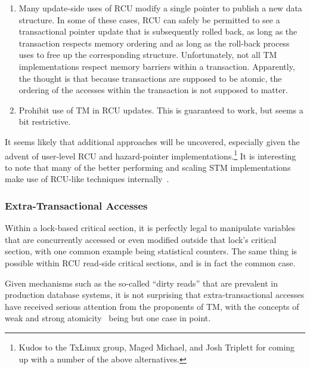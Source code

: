 \begin{enumerate}
	Furthermore, this approach is infeasible in cases where any of
	the RCU read-side critical sections contains operations that
	the TM implementation in question is incapable of handling.
	This approach is more difficult to apply to hazard pointers,
	which do not have a sharply defined notion of a reader as
	a section of code.
\item	Many update-side uses of RCU modify a single pointer to publish
	a new data structure.
	In some of these cases, RCU can safely be permitted to see a
	transactional pointer update that is subsequently rolled back,
	as long as the transaction respects memory ordering and as long
	as the roll-back process uses  to free up the
	corresponding structure.
	Unfortunately, not all TM implementations respect memory barriers
	within a transaction.
	Apparently, the thought is that because transactions are supposed
	to be atomic, the ordering of the accesses within the transaction
	is not supposed to matter.
\item	Prohibit use of TM in RCU updates.
	This is guaranteed to work, but seems a bit restrictive.
\end{enumerate}

It seems likely that additional approaches will be uncovered, especially
given the advent of user-level RCU and hazard-pointer
implementations.\footnote{
	Kudos to the TxLinux group, Maged Michael, and Josh Triplett
	for coming up with a number of the above alternatives.}
It is interesting to note that many of the better performing and
scaling STM implementations make use of RCU-like techniques
internally~\cite{KeirAnthonyFraserPhD,KeirFraser2007withoutLocks,Gu:2019:PSE:3358807.3358885}.

\subsubsection{Extra-Transactional Accesses}
\label{sec:future:Extra-Transactional Accesses}

Within a lock-based critical section, it is perfectly legal to manipulate
variables that are concurrently accessed or even modified outside that
lock's critical section, with one common example being statistical
counters.
The same thing is possible within RCU read-side critical
sections, and is in fact the common case.

Given mechanisms such as the so-called ``dirty reads'' that are
prevalent in production database systems, it is not surprising
that extra-transactional accesses have received serious attention
from the proponents of TM, with the concepts of weak and strong
atomicity~\cite{Blundell2006TMdeadlock} being but one case in point.

